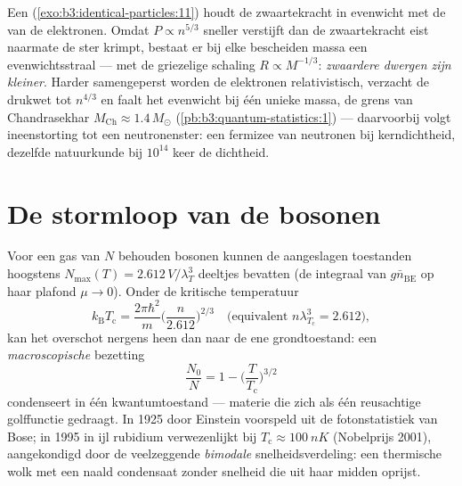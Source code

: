 \begin{example}\label{ex:b3:quantum-statistics:dwarf}
Een  (\cref{exo:b3:identical-particles:11}) houdt de
zwaartekracht in evenwicht met de  van de elektronen. Omdat
$P \propto
n^{5/3}$ sneller verstijft dan de zwaartekracht eist naarmate
de ster krimpt, bestaat er bij elke bescheiden massa een evenwichtsstraal
--- met de griezelige schaling $R \propto M^{-1/3}$: \emph{zwaardere
dwergen zijn kleiner}. Harder samengeperst worden de elektronen
relativistisch, verzacht de drukwet tot $n^{4/3}$ en faalt het evenwicht
bij één unieke massa, de grens van Chandrasekhar $M_{\text{Ch}} \approx
1.4\,M_\odot$ (\cref{pb:b3:quantum-statistics:1}) --- daarvoorbij volgt
ineenstorting tot een neutronenster: een fermizee van neutronen bij
kerndichtheid, dezelfde natuurkunde bij $10^{14}$ keer de dichtheid.
\end{example}

\section{De stormloop van de bosonen}

\begin{theorem}\label{thm:b3:quantum-statistics:bec}
Voor een gas van $N$ behouden bosonen kunnen de aangeslagen toestanden
hoogstens $N_{\max}(T) = 2.612\,V/\lambda_T^3$ deeltjes bevatten (de
integraal van $g\bar n_{\text{BE}}$ op haar plafond $\mu \to 0$). Onder de
kritische temperatuur
\[
k_{\text{B}}T_{\text{c}} = \frac{2\pi\hbar^2}{m}
\Big(\frac{n}{2.612}\Big)^{2/3}
\quad\text{(equivalent } n\lambda_{T_{\text{c}}}^3 = 2.612
\text{)} ,
\]
kan het overschot nergens heen dan naar de ene grondtoestand: een
\emph{macroscopische} bezetting
\[
\frac{N_0}{N} = 1 - \Big(\frac{T}{T_{\text{c}}}\Big)^{3/2}
\]
condenseert in één kwantumtoestand --- materie die zich als één
reusachtige golffunctie gedraagt. In 1925 door Einstein voorspeld uit de
fotonstatistiek van Bose; in 1995 in ijl rubidium verwezenlijkt bij
$T_{\text{c}} \approx \qty{100}{nK}$ (Nobelprijs 2001), aangekondigd door
de veelzeggende \emph{bimodale} snelheidsverdeling: een thermische wolk
met een naald condensaat zonder snelheid die uit haar midden oprijst.
\end{theorem}
\admitted

